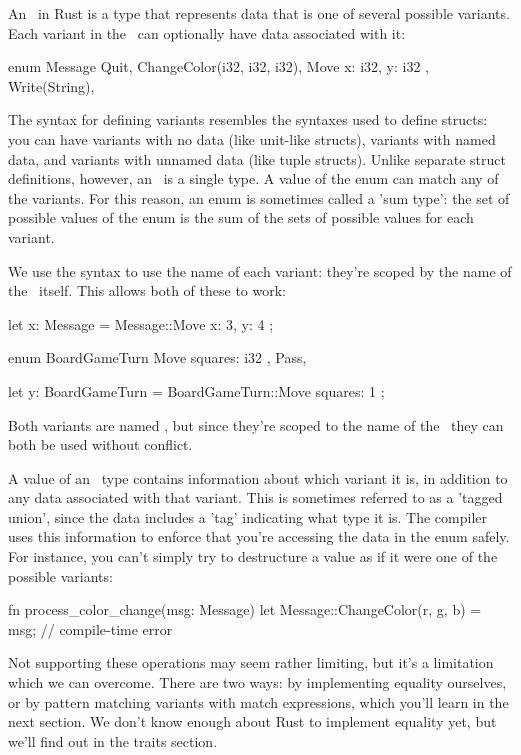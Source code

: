 An \enum\ in Rust is a type that represents data that is one of several possible variants. Each variant in the \enum\ can optionally 
have data associated with it:

\begin{rustc}
enum Message {
    Quit,
    ChangeColor(i32, i32, i32),
    Move { x: i32, y: i32 },
    Write(String),
}
\end{rustc}

The syntax for defining variants resembles the syntaxes used to define structs: you can have variants with no data (like unit-like 
structs), variants with named data, and variants with unnamed data (like tuple structs). Unlike separate struct definitions, however, 
an \enum\ is a single type. A value of the enum can match any of the variants. For this reason, an enum is sometimes called a 
'sum type': the set of possible values of the enum is the sum of the sets of possible values for each variant.

\blank

We use the \code{::} syntax to use the name of each variant: they're scoped by the name of the \enum\ itself. This allows both of 
these to work:

\begin{rustc}
let x: Message = Message::Move { x: 3, y: 4 };

enum BoardGameTurn {
    Move { squares: i32 },
    Pass,
}

let y: BoardGameTurn = BoardGameTurn::Move { squares: 1 };
\end{rustc}

Both variants are named , but since they're scoped to the name of the \enum\, they can both be used without conflict.

\blank

A value of an \enum\ type contains information about which variant it is, in addition to any data associated with that variant. This 
is sometimes referred to as a 'tagged union', since the data includes a 'tag' indicating what type it is. The compiler uses this 
information to enforce that you're accessing the data in the enum safely. For instance, you can't simply try to destructure a value 
as if it were one of the possible variants:

\begin{rustc}
fn process_color_change(msg: Message) {
    let Message::ChangeColor(r, g, b) = msg; // compile-time error
}
\end{rustc}

Not supporting these operations may seem rather limiting, but it's a limitation which we can overcome. There are two ways: by 
implementing equality ourselves, or by pattern matching variants with match expressions, which you'll learn in the next section. 
We don't know enough about Rust to implement equality yet, but we'll find out in the traits section.

